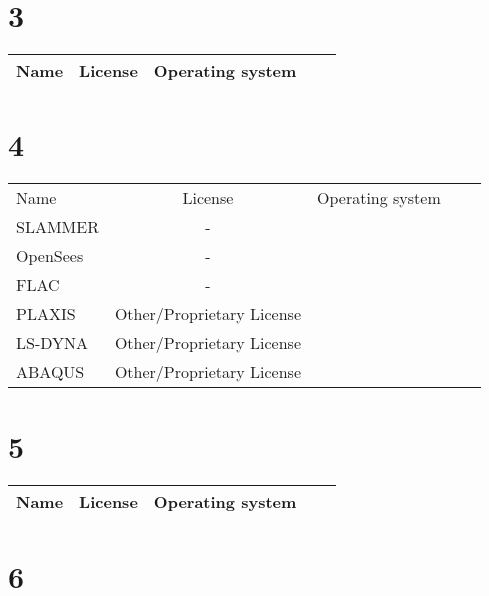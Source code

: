 \section{3}

\begin{table}[]
    \centering
    \begin{tabular}{l|cccc}
    \toprule
    Name &  License & Operating system\\

    \bottomrule
    \end{tabular}
    \end{table}

\section{4}

\begin{table}[]
    \centering
    \begin{tabular}{l|cccc}
    \toprule
    Name &  License & Operating system\\
        SLAMMER & - &\\
        OpenSees & - &\\
        FLAC & - &\\
        PLAXIS &  Other/Proprietary License &\\
        LS-DYNA &  Other/Proprietary License &\\
        ABAQUS &  Other/Proprietary License &\\

    \bottomrule
    \end{tabular}
    \end{table}

\section{5}

\begin{table}[]
    \centering
    \begin{tabular}{l|cccc}
    \toprule
    Name &  License & Operating system\\

    \bottomrule
    \end{tabular}
    \end{table}

\section{6}

